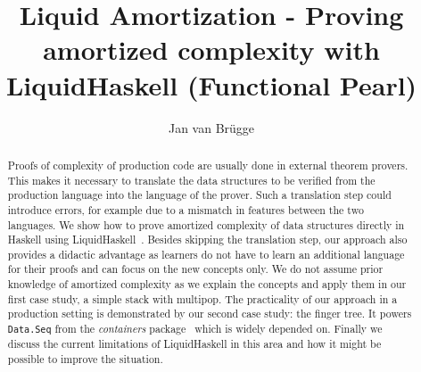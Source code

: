 \documentclass[sigplan,screen,review,anonymous]{acmart}
\begin{document}
\title{Liquid Amortization - Proving amortized complexity with LiquidHaskell (Functional Pearl)}

\author{Jan van Brügge}


\begin{abstract}
Proofs of complexity of production code are usually done in external theorem provers. This makes it necessary to translate the data structures to be verified from the production language into the language of the prover. Such a translation step could introduce errors, for example due to a mismatch in features between the two languages. We show how to prove amortized complexity of data structures directly in Haskell using LiquidHaskell~\cite{liquidhaskell}. Besides skipping the translation step, our approach also provides a didactic advantage as learners do not have to learn an additional language for their proofs and can focus on the new concepts only. We do not assume prior knowledge of amortized complexity as we explain the concepts and apply them in our first case study, a simple stack with multipop. The practicality of our approach in a production setting is demonstrated by our second case study: the finger tree. It powers \texttt{Data.Seq} from the \textit{containers} package~\cite{containers} which is widely depended on. Finally we discuss the current limitations of LiquidHaskell in this area and how it might be possible to improve the situation.
\end{abstract}
\end{document}
